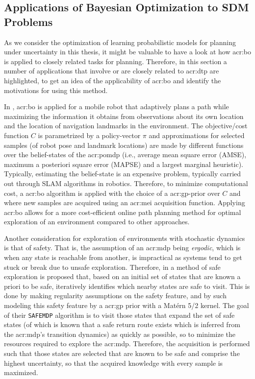 \subsection{Applications of Bayesian Optimization to SDM Problems}
\label{sec:bayesian-optimization-applications}

As we consider the optimization of learning probabilistic models for planning under uncertainty in this thesis, it might be valuable to have a look at how \acrlong{acr:bo} is applied to closely related tasks for planning.
Therefore, in this section a number of applications that involve or are closely related to \acrshort{acr:dtp} are highlighted, to get an idea of the applicability of \acrlong{acr:bo} and identify the motivations for using this method.

In \cite{MartinezCantin2009}, \acrlong{acr:bo} is applied for a mobile robot that adaptively plans a path while maximizing the information it obtains from observations about its own location and the location of navigation landmarks in the environment.
The objective/cost function $C$ is parametrized by a policy-vector $\pi$ and approximations for selected samples (of robot pose and landmark locations) are made by different functions over the belief-states of the \acrshort{acr:pomdp} (i.e., average mean square error (AMSE), maximum a posteriori square error (MAPSE) and a largest marginal heuristic).
Typically, estimating the belief-state is an expensive problem, typically carried out through SLAM algorithms in robotics.
Therefore, to minimize computational cost, a \acrlong{acr:bo} algorithm is applied with the choice of a \acrshort{acr:gp}-prior over $C$ and where new samples are acquired using an \acrshort{acr:mei} acquisition function.
Applying \acrlong{acr:bo} allows for a more cost-efficient online path planning method for optimal exploration of an environment compared to other approaches.

Another consideration for exploration of environments with stochastic dynamics is that of safety. That is, the assumption of an \acrshort{acr:mdp} being \textit{ergodic}, which is when any state is reachable from another, is impractical as systems tend to get stuck or break due to unsafe exploration. 
Therefore, in \cite{turchetta2016safe} a method of safe exploration is proposed that, based on an initial set of states that are known a priori to be safe, iteratively identifies which nearby states are safe to visit.
This is done by making regularity assumptions on the safety feature, and by such modeling this safety feature by a \acrshort{acr:gp} prior with a Mat\'ern 5/2 kernel.
The goal of their \texttt{SAFEMDP} algorithm is to visit those states that expand the set of safe states (of which is known that a safe return route exists which is inferred from the \acrshort{acr:mdp}'s transition dynamics) as quickly as possible, so to minimize the resources required to explore the \acrshort{acr:mdp}.
Therefore, the acquisition is performed such that those states are selected that are known to be safe and comprise the highest uncertainty, so that the acquired knowledge with every sample is maximized.

